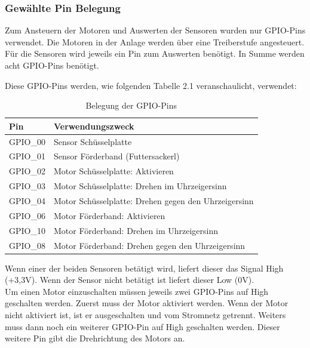 \vspace{80pt}

\subsubsection{Gewählte Pin Belegung}
Zum Ansteuern der Motoren und Auswerten der Sensoren wurden nur \ac{GPIO}-Pins verwendet. Die Motoren in der Anlage werden über eine Treiberstufe angesteuert. Für die Sensoren wird jeweils ein Pin zum Auswerten benötigt. In Summe werden acht \ac{GPIO}-Pins benötigt. 

\newpage

Diese \ac{GPIO}-Pins werden, wie folgenden Tabelle 2.1 veranschaulicht, verwendet:

\begin{table}[htb]
\centering
\begin{tabular}{|l|l|}
\hline
\textbf{Pin} & \textbf{Verwendungszweck}          \\ \hline
\ac{GPIO}\_00     & Sensor Schüsselplatte              \\ \hline
\ac{GPIO}\_01     & Sensor Förderband (Futtersackerl)  \\ \hline
\ac{GPIO}\_02     & Motor Schüsselplatte: Aktivieren \\ \hline
\ac{GPIO}\_03     & Motor Schüsselplatte: Drehen im Uhrzeigersinn \\ \hline
\ac{GPIO}\_04     & Motor Schüsselplatte: Drehen gegen den Uhrzeigersinn \\ \hline
\ac{GPIO}\_06     & Motor Förderband: Aktivieren     \\ \hline
\ac{GPIO}\_10     & Motor Förderband: Drehen im Uhrzeigersinn     \\ \hline
\ac{GPIO}\_08     & Motor Förderband: Drehen gegen den Uhrzeigersinn     \\ \hline
\end{tabular}
\caption{Belegung der \ac{GPIO}-Pins}
\label{Pinbelegung}
\end{table}

Wenn einer der beiden Sensoren betätigt wird, liefert dieser das Signal High (+3,3V). Wenn der Sensor nicht betätigt ist liefert dieser Low (0V). 
\\ Um einen Motor einzuschalten müssen jeweils zwei \ac{GPIO}-Pins auf High geschalten werden. Zuerst muss der Motor aktiviert werden. Wenn der Motor nicht aktiviert ist, ist er ausgeschalten und vom Stromnetz getrennt. Weiters muss dann noch ein weiterer \ac{GPIO}-Pin auf High geschalten werden. Dieser weitere Pin gibt die Drehrichtung des Motors an. 

